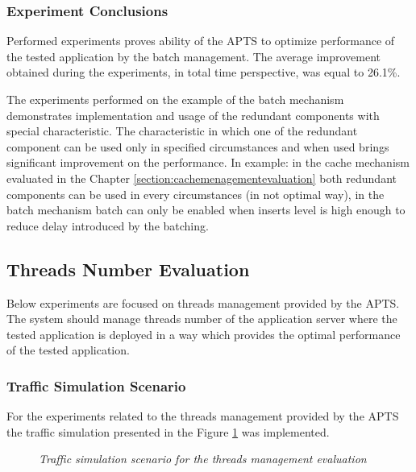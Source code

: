 \documentclass[10pt,a4paper]{article}
\begin{document}
\subsubsection{Experiment Conclusions} 

Performed experiments proves ability of the APTS to optimize performance of the tested application by the batch management. The average improvement obtained during the experiments, in total time perspective, was equal to 26.1\%. 

The experiments performed on the example of the batch mechanism demonstrates implementation and usage of the redundant components with special characteristic. The characteristic in which one of the redundant component can be used only in specified circumstances and when used brings significant improvement on the performance. In example: in the cache mechanism evaluated in the Chapter \ref{section:cachemenagementevaluation} both redundant components can be used in every circumstances (in not optimal way), in the batch mechanism batch can only be enabled when inserts level is high enough to reduce delay introduced by the batching.  


\subsection{Threads Number Evaluation}

Below experiments are focused on threads management provided by the APTS. The system should manage threads number of the application server where the tested application is deployed in a way which provides the optimal performance of the tested application. 

\subsubsection{Traffic Simulation Scenario}

For the experiments related to the threads management provided by the APTS the traffic simulation presented in the Figure \ref{figure:trafficthreads} was implemented. 

\begin{figure}[!htb]
\begin{center}
\caption{\textit{Traffic simulation scenario for the threads management evaluation}} \label{figure:trafficthreads}
\end{center}
\end{figure}
\end{document}
